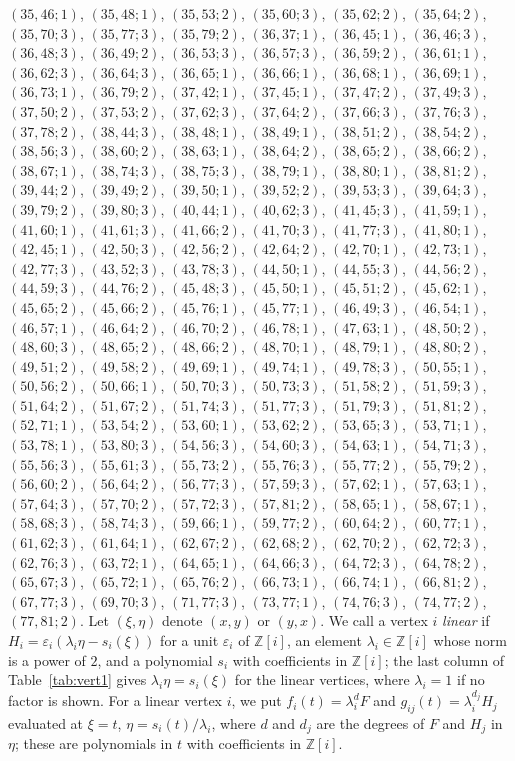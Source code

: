 \documentclass[11pt]{article}
\newcommand{\Z}{\mathbb{Z}}
\begin{document}
$(35,46;1)$, $(35,48;1)$, $(35,53;2)$, $(35,60;3)$, $(35,62;2)$, $(35,64;2)$, $(35,70;3)$, $(35,77;3)$, $(35,79;2)$, $(36,37;1)$, $(36,45;1)$, $(36,46;3)$, $(36,48;3)$, $(36,49;2)$, $(36,53;3)$, $(36,57;3)$, $(36,59;2)$, $(36,61;1)$, $(36,62;3)$, $(36,64;3)$, $(36,65;1)$, $(36,66;1)$, $(36,68;1)$, $(36,69;1)$, $(36,73;1)$, $(36,79;2)$, $(37,42;1)$, $(37,45;1)$, $(37,47;2)$, $(37,49;3)$, $(37,50;2)$, $(37,53;2)$, $(37,62;3)$, $(37,64;2)$, $(37,66;3)$, $(37,76;3)$, $(37,78;2)$, $(38,44;3)$, $(38,48;1)$, $(38,49;1)$, $(38,51;2)$, $(38,54;2)$, $(38,56;3)$, $(38,60;2)$, $(38,63;1)$, $(38,64;2)$, $(38,65;2)$, $(38,66;2)$, $(38,67;1)$, $(38,74;3)$, $(38,75;3)$, $(38,79;1)$, $(38,80;1)$, $(38,81;2)$, $(39,44;2)$, $(39,49;2)$, $(39,50;1)$, $(39,52;2)$, $(39,53;3)$, $(39,64;3)$, $(39,79;2)$, $(39,80;3)$, $(40,44;1)$, $(40,62;3)$, $(41,45;3)$, $(41,59;1)$, $(41,60;1)$, $(41,61;3)$, $(41,66;2)$, $(41,70;3)$, $(41,77;3)$, $(41,80;1)$, $(42,45;1)$, $(42,50;3)$, $(42,56;2)$, $(42,64;2)$, $(42,70;1)$, $(42,73;1)$, $(42,77;3)$, $(43,52;3)$, $(43,78;3)$, $(44,50;1)$, $(44,55;3)$, $(44,56;2)$, $(44,59;3)$, $(44,76;2)$, $(45,48;3)$, $(45,50;1)$, $(45,51;2)$, $(45,62;1)$, $(45,65;2)$, $(45,66;2)$, $(45,76;1)$, $(45,77;1)$, $(46,49;3)$, $(46,54;1)$, $(46,57;1)$, $(46,64;2)$, $(46,70;2)$, $(46,78;1)$, $(47,63;1)$, $(48,50;2)$, $(48,60;3)$, $(48,65;2)$, $(48,66;2)$, $(48,70;1)$, $(48,79;1)$, $(48,80;2)$, $(49,51;2)$, $(49,58;2)$, $(49,69;1)$, $(49,74;1)$, $(49,78;3)$, $(50,55;1)$, $(50,56;2)$, $(50,66;1)$, $(50,70;3)$, $(50,73;3)$, $(51,58;2)$, $(51,59;3)$, $(51,64;2)$, $(51,67;2)$, $(51,74;3)$, $(51,77;3)$, $(51,79;3)$, $(51,81;2)$, $(52,71;1)$, $(53,54;2)$, $(53,60;1)$, $(53,62;2)$, $(53,65;3)$, $(53,71;1)$, $(53,78;1)$, $(53,80;3)$, $(54,56;3)$, $(54,60;3)$, $(54,63;1)$, $(54,71;3)$, $(55,56;3)$, $(55,61;3)$, $(55,73;2)$, $(55,76;3)$, $(55,77;2)$, $(55,79;2)$, $(56,60;2)$, $(56,64;2)$, $(56,77;3)$, $(57,59;3)$, $(57,62;1)$, $(57,63;1)$, $(57,64;3)$, $(57,70;2)$, $(57,72;3)$, $(57,81;2)$, $(58,65;1)$, $(58,67;1)$, $(58,68;3)$, $(58,74;3)$, $(59,66;1)$, $(59,77;2)$, $(60,64;2)$, $(60,77;1)$, $(61,62;3)$, $(61,64;1)$, $(62,67;2)$, $(62,68;2)$, $(62,70;2)$, $(62,72;3)$, $(62,76;3)$, $(63,72;1)$, $(64,65;1)$, $(64,66;3)$, $(64,72;3)$, $(64,78;2)$, $(65,67;3)$, $(65,72;1)$, $(65,76;2)$, $(66,73;1)$, $(66,74;1)$, $(66,81;2)$, $(67,77;3)$, $(69,70;3)$, $(71,77;3)$, $(73,77;1)$, $(74,76;3)$, $(74,77;2)$, $(77,81;2)$.
Let $(\xi,\eta)$ denote $(x,y)$ or $(y,x)$. We call a vertex $i$ \emph{linear} if $H_i=\varepsilon_i(\lambda_i\eta-s_i(\xi))$ for a unit $\varepsilon_i$ of $\Z[i]$, an element $\lambda_i\in\Z[i]$ whose norm is a power of $2$, and a polynomial $s_i$ with coefficients in $\Z[i]$; the last column of Table~\ref{tab:vert1} gives $\lambda_i\eta=s_i(\xi)$ for the linear vertices, where $\lambda_i=1$ if no factor is shown. For a linear vertex $i$, we put $f_i(t)=\lambda_i^{d}F$ and $g_{ij}(t)=\lambda_i^{d_j}H_j$ evaluated at $\xi=t$, $\eta=s_i(t)/\lambda_i$, where $d$ and $d_j$ are the degrees of $F$ and $H_j$ in $\eta$; these are polynomials in $t$ with coefficients in $\Z[i]$.
\end{document}
